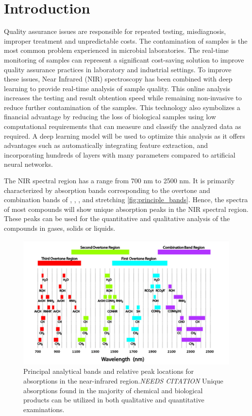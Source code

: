 \documentclass[12pt]{report}
\renewcommand{\cite}{\supercite}
\begin{document}
\section{Introduction} %
Quality assurance issues are responsible for repeated testing, misdiagnosis, improper treatment and unpredictable costs.\cite{CostPoorQualityrandoxlaboratories} The contamination of samples is the most common problem experienced in microbial laboratories. The real-time monitoring of samples can represent a significant cost-saving solution to improve quality assurance practices in laboratory and industrial settings.\cite{ContaminationMicrobiologicalLaboratoryendeshawabatenh2018} To improve these issues, Near Infrared (NIR) spectroscopy has been combined with deep learning to provide real-time analysis of sample quality. This online analysis increases the testing and result obtention speed while remaining non-invasive to reduce further contamination of the samples.\cite{SpeechRecognitionUsingalsobhani2021} This technology also symbolizes a financial advantage by reducing the loss of biological samples using low computational requirements that can measure and classify the analyzed data as required. A deep learning model will be used to optimize this analysis as it offers advantages such as automatically integrating feature extraction, and incorporating hundreds of layers with many parameters compared to artificial neural networks.\cite{DeepLearningNearinfraredmishra2022}

The NIR spectral region has a range from 700 nm to 2500 nm. It is primarily characterized by absorption bands corresponding to the overtone and combination bands of , , , and  stretching \autoref{fig:principle_bands}. Hence, the spectra of most compounds will show unique absorption peaks in the NIR spectral region. These peaks can be used for the quantitative and qualitative analysis of the compounds in gases, solids or liquids.

\begin{figure}[h]
    \centering
    \includegraphics[width=0.75\linewidth]{Images/principle_bands.png}
    \caption{Principal analytical bands and relative peak locations for absorptions in the near-infrared region.\emph{NEEDS CITATION} Unique absorptions found in the majority of chemical and biological products can be utilized in both qualitative and quantitative examinations.}
    \label{fig:principle_bands}
\end{figure}
\end{document}
